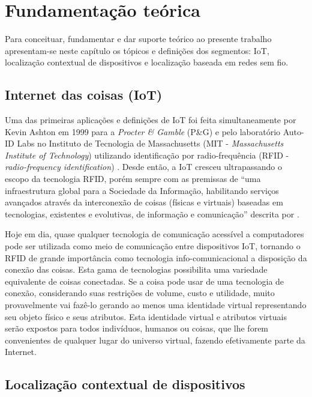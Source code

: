 \chapter{Fundamentação teórica}
\label{chap:Fundamentação teorica}


Para conceituar, fundamentar e dar suporte teórico ao presente trabalho
apresentam-se neste capítulo os tópicos e definições dos segmentos: IoT,
localização contextual de dispositivos e localização baseada em redes sem fio.

\section{Internet das coisas (IoT)}
\label{sec:INTERNET DAS COISAS (IOT)}

Uma das primeiras aplicações e definições de IoT foi feita simultaneamente por
Kevin Ashton em 1999 para a \emph{Procter \& Gamble} (P\&G) \cite{Ashton2009} e
pelo laboratório Auto-ID Labs no Instituto de Tecnologia de Massachusetts (MIT -
\emph{Massachusetts Institute of Technology}) utilizando identificação por
radio-frequência (RFID - \emph{radio-frequency identification})
\cite{ATZORI2010, Friedemann2011}. Desde então, a IoT cresceu ultrapassando o
escopo da tecnologia RFID, porém sempre com as premissas de ``uma infraestrutura
global para a Sociedade da Informação, habilitando serviços avançados através da
interconexão de coisas (físicas e virtuais) baseadas em tecnologias, existentes
e evolutivas, de informação e comunicação'' descrita por .

Hoje em dia, quase qualquer tecnologia de comunicação acessível a computadores
pode ser utilizada como meio de comunicação entre dispositivos IoT, tornando
o RFID de grande importância como tecnologia info-comunicacional a
disposição da conexão das coisas. Esta gama de tecnologias possibilita uma
variedade equivalente de coisas conectadas. Se a coisa pode usar de uma
tecnologia de conexão, considerando suas restrições de volume, custo e
utilidade, muito provavelmente vai fazê-lo gerando ao menos uma identidade
virtual representando seu objeto físico e seus atributos. Esta identidade
virtual e atributos virtuais serão expostos para todos indivíduos, humanos ou
coisas, que lhe forem convenientes de qualquer lugar do universo virtual,
fazendo efetivamente parte da Internet.

\section{Localização contextual de dispositivos}
\label{sec:Localização contextual de dispositivos}

